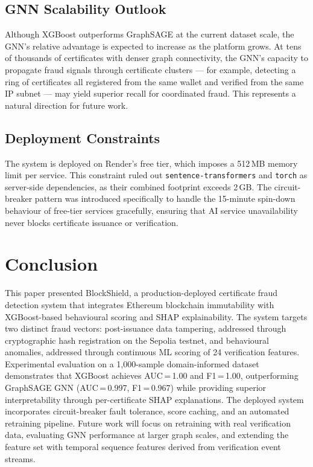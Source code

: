 \documentclass[conference]{IEEEtran}
\begin{document}
\subsection{GNN Scalability Outlook}

Although XGBoost outperforms GraphSAGE at the current dataset scale,
the GNN's relative advantage is expected to increase as the platform
grows. At tens of thousands of certificates with denser graph
connectivity, the GNN's capacity to propagate fraud signals through
certificate clusters — for example, detecting a ring of certificates
all registered from the same wallet and verified from the same IP
subnet — may yield superior recall for coordinated fraud. This
represents a natural direction for future work.

\subsection{Deployment Constraints}

The system is deployed on Render's free tier, which imposes a
512\,MB memory limit per service. This constraint ruled out
\texttt{sentence-transformers} and \texttt{torch} as server-side
dependencies, as their combined footprint exceeds 2\,GB. The
circuit-breaker pattern was introduced specifically to handle the
15-minute spin-down behaviour of free-tier services gracefully,
ensuring that AI service unavailability never blocks certificate
issuance or verification.

\section{Conclusion}

This paper presented BlockShield, a production-deployed certificate
fraud detection system that integrates Ethereum blockchain
immutability with XGBoost-based behavioural scoring and SHAP
explainability. The system targets two distinct fraud vectors:
post-issuance data tampering, addressed through cryptographic hash
registration on the Sepolia testnet, and behavioural anomalies,
addressed through continuous ML scoring of 24 verification features.
Experimental evaluation on a 1,000-sample domain-informed dataset
demonstrates that XGBoost achieves AUC\,=\,1.00 and F1\,=\,1.00,
outperforming GraphSAGE GNN (AUC\,=\,0.997, F1\,=\,0.967) while
providing superior interpretability through per-certificate SHAP
explanations. The deployed system incorporates circuit-breaker fault
tolerance, score caching, and an automated retraining pipeline.
Future work will focus on retraining with real verification data,
evaluating GNN performance at larger graph scales, and extending
the feature set with temporal sequence features derived from
verification event streams.
\end{document}
